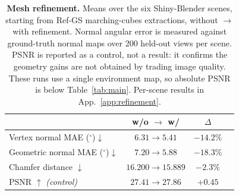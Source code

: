 \begin{table}[t]
\centering
\small
\caption{\textbf{Mesh refinement.} Means over the six Shiny-Blender scenes, starting from Ref-GS
marching-cubes extractions, without $\rightarrow$ with refinement. Normal angular error is measured
against ground-truth normal maps over 200 held-out views per scene. PSNR is reported as a control,
not a result: it confirms the geometry gains are not obtained by trading image quality. These runs
use a single environment map, so absolute PSNR is below Table~\ref{tab:main}. Per-scene results in
App.~\ref{app:refinement}.}
\label{tab:refinement}
\begin{tabular}{lccc}
\toprule
& w/o $\rightarrow$ w/ & $\Delta$ \\
\midrule
Vertex normal MAE ($^\circ$)$\downarrow$     & $6.31 \rightarrow 5.41$       & $-14.2\%$ \\
Geometric normal MAE ($^\circ$)$\downarrow$  & $7.20 \rightarrow 5.88$       & $-18.3\%$ \\
Chamfer distance $\downarrow$                & $16.200 \rightarrow 15.889$   & $-2.3\%$  \\
\midrule
PSNR $\uparrow$ \emph{(control)}             & $27.41 \rightarrow 27.86$     & $+0.45$   \\
\bottomrule
\end{tabular}
\end{table}